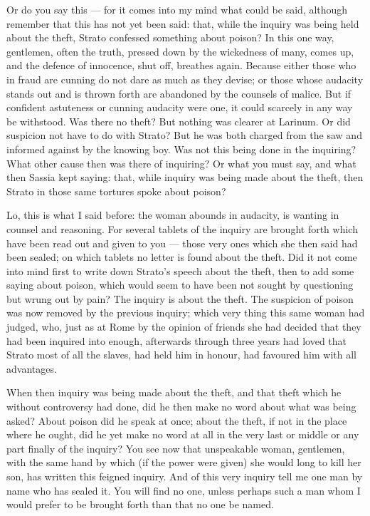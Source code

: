  Or do you say this --- for it comes into my mind what could be said, although remember that this has not yet been said: that, while the inquiry was being held about the theft, Strato confessed something about poison? In this one way, gentlemen, often the truth, pressed down by the wickedness of many, comes up, and the defence of innocence, shut off, breathes again. Because either those who in fraud are cunning do not dare as much as they devise; or those whose audacity stands out and is thrown forth are abandoned by the counsels of malice. But if confident astuteness or cunning audacity were one, it could scarcely in any way be withstood. Was there no theft? But nothing was clearer at Larinum. Or did suspicion not have to do with Strato? But he was both charged from the saw and informed against by the knowing boy. Was not this being done in the inquiring? What other cause then was there of inquiring? Or what you must say, and what then Sassia kept saying: that, while inquiry was being made about the theft, then Strato in those same tortures spoke about poison?

 Lo, this is what I said before: the woman abounds in audacity, is wanting in counsel and reasoning. For several tablets of the inquiry are brought forth which have been read out and given to you --- those very ones which she then said had been sealed; on which tablets no letter is found about the theft. Did it not come into mind first to write down Strato's speech about the theft, then to add some saying about poison, which would seem to have been not sought by questioning but wrung out by pain? The inquiry is about the theft. The suspicion of poison was now removed by the previous inquiry; which very thing this same woman had judged, who, just as at Rome by the opinion of friends she had decided that they had been inquired into enough, afterwards through three years had loved that Strato most of all the slaves, had held him in honour, had favoured him with all advantages.

 When then inquiry was being made about the theft, and that theft which he without controversy had done, did he then make no word about what was being asked? About poison did he speak at once; about the theft, if not in the place where he ought, did he yet make no word at all in the very last or middle or any part finally of the inquiry? You see now that unspeakable woman, gentlemen, with the same hand by which (if the power were given) she would long to kill her son, has written this feigned inquiry. And of this very inquiry tell me one man by name who has sealed it. You will find no one, unless perhaps such a man whom I would prefer to be brought forth than that no one be named.

